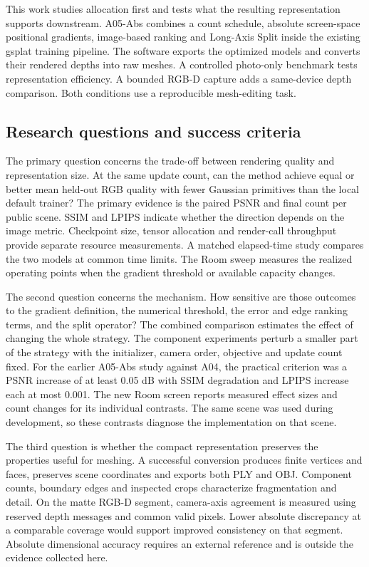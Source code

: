 This work studies allocation first and tests what the resulting representation supports downstream. A05-Abs combines a count schedule, absolute screen-space positional gradients, image-based ranking and Long-Axis Split inside the existing gsplat training pipeline. The software exports the optimized models and converts their rendered depths into raw meshes. A controlled photo-only benchmark tests representation efficiency. A bounded RGB-D capture adds a same-device depth comparison. Both conditions use a reproducible mesh-editing task.

\subsection{Research questions and success criteria}
The primary question concerns the trade-off between rendering quality and representation size. At the same update count, can the method achieve equal or better mean held-out RGB quality with fewer Gaussian primitives than the local default trainer? The primary evidence is the paired PSNR and final count per public scene. SSIM and LPIPS indicate whether the direction depends on the image metric. Checkpoint size, tensor allocation and render-call throughput provide separate resource measurements. A matched elapsed-time study compares the two models at common time limits. The Room sweep measures the realized operating points when the gradient threshold or available capacity changes.

The second question concerns the mechanism. How sensitive are those outcomes to the gradient definition, the numerical threshold, the error and edge ranking terms, and the split operator? The combined comparison estimates the effect of changing the whole strategy. The component experiments perturb a smaller part of the strategy with the initializer, camera order, objective and update count fixed. For the earlier A05-Abs study against A04, the practical criterion was a PSNR increase of at least 0.05 dB with SSIM degradation and LPIPS increase each at most 0.001. The new Room screen reports measured effect sizes and count changes for its individual contrasts. The same scene was used during development, so these contrasts diagnose the implementation on that scene.

The third question is whether the compact representation preserves the properties useful for meshing. A successful conversion produces finite vertices and faces, preserves scene coordinates and exports both PLY and OBJ. Component counts, boundary edges and inspected crops characterize fragmentation and detail. On the matte RGB-D segment, camera-axis agreement is measured using reserved depth messages and common valid pixels. Lower absolute discrepancy at a comparable coverage would support improved consistency on that segment. Absolute dimensional accuracy requires an external reference and is outside the evidence collected here.

